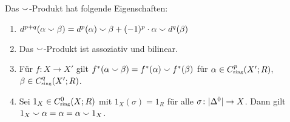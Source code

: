 \begin{lemma}[{name=[Eigenschaften des Cup-Produktes]},label=lem:eig_cup]
	Das $\smallsmile$-Produkt hat folgende Eigenschaften:
	\begin{enumerate}[1)]
		\item $d^{p+q}(\alpha \smallsmile \beta) = d^p(\alpha) \smallsmile \beta + (-1)^p \cdot \alpha \smallsmile d^q(\beta)$
		\item Das $\smallsmile$-Produkt ist assoziativ und bilinear.
		\item Für $f \colon X \to X'$ gilt $f^*(\alpha \smallsmile \beta)= f^*(\alpha) \smallsmile f^*(\beta)$ für $\alpha \in C^p_\sing(X';R)$, $\beta \in C^q_\sing(X';R)$.
		\item Sei $1_X \in C_\sing^0(X;R)$ mit $1_X(\sigma)=1_R$ für alle $\sigma \colon \lvert\Delta^0\rvert \to X$. Dann gilt $1_X \smallsmile \alpha = \alpha = \alpha\smallsmile 1_X$.
	\end{enumerate}
\end{lemma}
